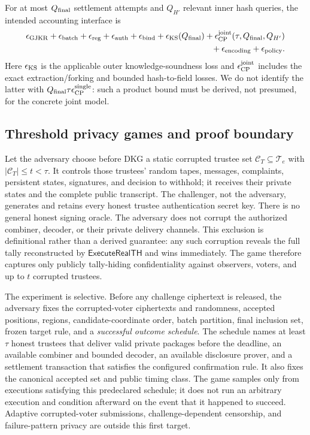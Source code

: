 \documentclass[pdflatex,sn-mathphys-num]{sn-jnl}%
\theoremstyle{thmstyleone}%
\theoremstyle{thmstyletwo}%
\theoremstyle{thmstylethree}%
\begin{document}
For at most $Q_{\rm final}$ settlement attempts and $Q_{H'}$ relevant inner
hash queries, the intended accounting interface is
\[
\begin{aligned}
 \epsilon_{\rm GJKR}+\epsilon_{\rm batch}+\epsilon_{\rm reg}
 +\epsilon_{\rm auth}+\epsilon_{\rm bind}
 +\epsilon_{\rm KS}(Q_{\rm final})
 +\epsilon_{\rm CP}^{\rm joint}(\tau,Q_{\rm final},Q_{H'})\\
 {}+\epsilon_{\rm encoding}+\epsilon_{\rm policy}.
\end{aligned}
\]
Here $\epsilon_{\rm KS}$ is the applicable outer knowledge-soundness loss and
$\epsilon_{\rm CP}^{\rm joint}$ includes the exact extraction/forking and
bounded hash-to-field losses.  We do not identify the latter with
$Q_{\rm final}\tau\epsilon_{\rm CP}^{\rm single}$: such a product bound must
be derived, not presumed, for the concrete joint model.

\subsection{Threshold privacy games and proof boundary}
\label{subsec:threshold-privacy}

Let the adversary choose before DKG a static corrupted trustee set
$\mathcal C_T\subseteq\mathcal T_e$ with
$|\mathcal C_T|\leq t<\tau$.  It controls those trustees' random tapes,
messages, complaints, persistent states, signatures, and decision to withhold;
it receives their private states and the complete public transcript.  The
challenger, not the adversary, generates and retains every honest trustee
authentication secret key.  There is no general honest signing oracle.
The adversary does not corrupt the authorized combiner, decoder, or their
private delivery channels.  This exclusion is definitional rather than a
derived guarantee: any such corruption reveals the full tally reconstructed
by $\mathsf{ExecuteRealTH}$ and wins immediately.  The game therefore captures
only publicly tally-hiding confidentiality against observers, voters, and up
to $t$ corrupted trustees.

The experiment is selective.  Before any challenge ciphertext is released,
the adversary fixes the corrupted-voter ciphertexts and randomness, accepted
positions, regions, candidate-coordinate order, batch partition, final
inclusion set, frozen target rule, and a \emph{successful outcome schedule}.
The schedule names at least $\tau$ honest trustees that deliver valid private
packages before the deadline, an available combiner and bounded decoder, an
available disclosure prover, and a settlement transaction that satisfies the
configured confirmation rule.  It also fixes the canonical accepted set and
public timing class.  The game samples only from executions satisfying this
predeclared schedule; it does not run an arbitrary execution and condition
afterward on the event that it happened to succeed.  Adaptive corrupted-voter
submissions, challenge-dependent censorship, and failure-pattern privacy are
outside this first target.
\end{document}
